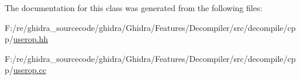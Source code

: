 The documentation for this class was generated from the following files\+:\begin{DoxyCompactItemize}
\item 
F\+:/re/ghidra\+\_\+sourcecode/ghidra/\+Ghidra/\+Features/\+Decompiler/src/decompile/cpp/\mbox{\hyperlink{userop_8hh}{userop.\+hh}}\item 
F\+:/re/ghidra\+\_\+sourcecode/ghidra/\+Ghidra/\+Features/\+Decompiler/src/decompile/cpp/\mbox{\hyperlink{userop_8cc}{userop.\+cc}}\end{DoxyCompactItemize}
